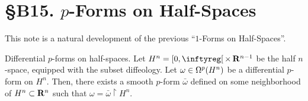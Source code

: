 
\chapter*{\S B15. $p$-Forms on Half-Spaces}
\setcounter{footnote}{0}


\begin{abstract}
  We shall see that every differential $p$-form on the half-space $H^n = [0,\infty[ \,\times\, \RR^{n-1}$ is the restriction of a smooth $p$-form on $\RR^n$.
\end{abstract}


This note is a natural development of the previous ``$1$-Forms on Half-Spaces''.

\begin{Article}{Differential $p$-forms on half-spaces.}{}
  Let $H^n = [0,\infty[ \,\times\, \RR^{n-1}$ be the half $n$-space,
  equipped with the subset diffeology.
  Let $\omega \in \Omega^p(H^n)$ be a differential $p$-form on $H^n$.
  Then,
  there exists a smooth $p$-form $\bar\omega$ defined on some neighborhood of $H^n \subset \mathbf{R}^n$ such that $\omega = \bar\omega \restriction H^n$.
\end{Article}

